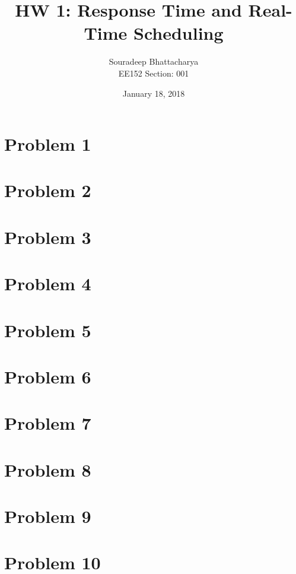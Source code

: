\documentclass{article}
\title{HW 1: Response Time and Real-Time Scheduling}
\date{January 18, 2018}
\author{Souradeep Bhattacharya \\ EE152 Section: 001}
\begin{document}
	\maketitle
	\section*{Problem 1}
	\section*{Problem 2}
	\section*{Problem 3}
	\section*{Problem 4}
	\section*{Problem 5}
	\section*{Problem 6}
	\section*{Problem 7}
	\section*{Problem 8}
	\section*{Problem 9}
	\section*{Problem 10}
\end{document}
